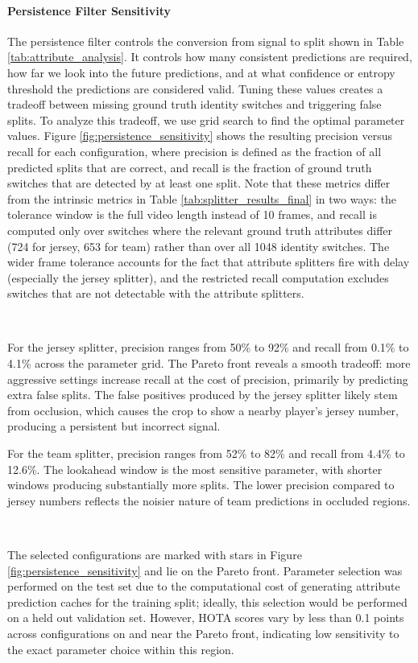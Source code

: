 \paragraph{Persistence Filter Sensitivity}
The persistence filter controls the conversion from signal to split shown in Table \ref{tab:attribute_analysis}. It controls how many consistent predictions are required, how far we look into the future predictions, and at what confidence or entropy threshold the predictions are considered valid. Tuning these values creates a tradeoff between missing ground truth identity switches and triggering false splits. To analyze this tradeoff, we use grid search to find the optimal parameter values. Figure \ref{fig:persistence_sensitivity} shows the resulting precision versus recall for each configuration, where precision is defined as the fraction of all predicted splits that are correct, and recall is the fraction of ground truth switches that are detected by at least one split. Note that these metrics differ from the intrinsic metrics in Table \ref{tab:splitter_results_final} in two ways: the tolerance window is the full video length instead of 10 frames, and recall is computed only over switches where the relevant ground truth attributes differ (724 for jersey, 653 for team) rather than over all 1048 identity switches. The wider frame tolerance accounts for the fact that attribute splitters fire with delay (especially the jersey splitter), and the restricted recall computation excludes switches that are not detectable with the attribute splitters.

\

For the jersey splitter, precision ranges from 50\% to 92\% and recall from 0.1\% to 4.1\% across the parameter grid. The Pareto front reveals a smooth tradeoff: more aggressive settings increase recall at the cost of precision, primarily by predicting extra false splits. The false positives produced by the jersey splitter likely stem from occlusion, which causes the crop to show a nearby player's jersey number, producing a persistent but incorrect signal.

For the team splitter, precision ranges from 52\% to 82\% and recall from 4.4\% to 12.6\%. The lookahead window is the most sensitive parameter, with shorter windows producing substantially more splits. The lower precision compared to jersey numbers reflects the noisier nature of team predictions in occluded regions.

\

The selected configurations are marked with stars in Figure \ref{fig:persistence_sensitivity} and lie on the Pareto front. Parameter selection was performed on the test set due to the computational cost of generating attribute prediction caches for the training split; ideally, this selection would be performed on a held out validation set. However, HOTA scores vary by less than 0.1 points across configurations on and near the Pareto front, indicating low sensitivity to the exact parameter choice within this region.

